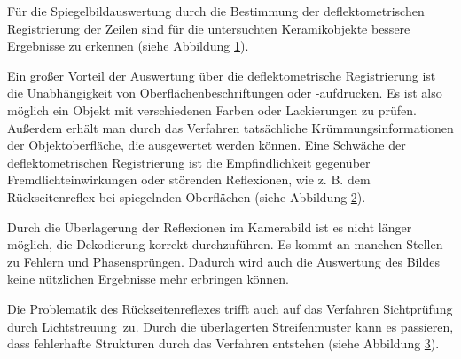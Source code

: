 \p
Für die Spiegelbildauswertung durch die Bestimmung der deflektometrischen Registrierung der Zeilen sind für die untersuchten Keramikobjekte bessere Ergebnisse zu erkennen (siehe Abbildung \ref{tikz:abbErkennbareDefekteRegistrierung}).

{
	\begin{figure}[H]
		\centering
		
		\label{tikz:abbErkennbareDefekteRegistrierung}
	\end{figure}
}

\noindent
Ein großer Vorteil der Auswertung über die deflektometrische Registrierung ist die Unabhängigkeit von Oberflächenbeschriftungen oder -aufdrucken.
Es ist also möglich ein Objekt mit verschiedenen Farben oder Lackierungen zu prüfen.
Außerdem erhält man durch das Verfahren tatsächliche Krümmungsinformationen der Objektoberfläche, die ausgewertet werden können.
Eine Schwäche der deflektometrischen Registrierung ist die Empfindlichkeit gegenüber Fremdlichteinwirkungen oder störenden Reflexionen, wie z. B. dem Rückseitenreflex bei spiegelnden Oberflächen (siehe Abbildung \ref{tikz:abbRückseitenreflexRegistrierung}).

{
	\begin{figure}[H]
		\centering
		
		\label{tikz:abbRückseitenreflexRegistrierung}
	\end{figure}
}

\noindent
Durch die Überlagerung der Reflexionen im Kamerabild ist es nicht länger möglich, die Dekodierung korrekt durchzuführen.
Es kommt an manchen Stellen zu Fehlern und Phasensprüngen.
Dadurch wird auch die Auswertung des Bildes keine nützlichen Ergebnisse mehr erbringen können.

\p
Die Problematik des Rückseitenreflexes trifft auch auf das Verfahren \glqq Sichtprüfung durch Lichtstreuung\grqq ~zu.
Durch die überlagerten Streifenmuster kann es passieren, dass fehlerhafte Strukturen durch das Verfahren entstehen (siehe Abbildung \ref{tikz:abbRückseitenreflexLichtstreuung}).

{
	\begin{figure}[H]
		\centering
		
		\label{tikz:abbRückseitenreflexLichtstreuung}
	\end{figure}
}

